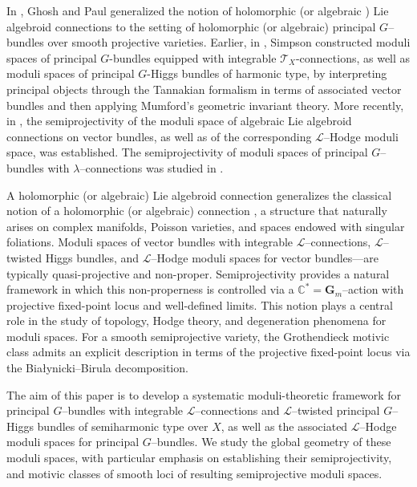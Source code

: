 \documentclass[12pt,reqno]{amsart}
\numberwithin{equation}{subsection}
\theoremstyle{definition}
\theoremstyle{theorem}
\begin{document}
 
In \cite{Ghosh-Paul-2025}, Ghosh and Paul generalized the notion of holomorphic (or algebraic ) Lie algebroid connections to the setting of holomorphic (or algebraic) principal $G$--bundles over smooth projective varieties. Earlier, in \cite{CT.Simpson-1995}, Simpson constructed moduli spaces of principal \(G\)-bundles equipped with integrable \(\mathcal{T}_{X}\)-connections, as well as moduli spaces of principal \(G\)-Higgs bundles of harmonic type, by interpreting principal objects through the Tannakian formalism in terms of associated vector bundles and then applying Mumford's geometric invariant theory. More recently, in \cite{Alfaya-Oliveire-2024}, the semiprojectivity of the moduli space of algebraic Lie algebroid connections on vector bundles, as well as of the corresponding $\mathcal{L}$--Hodge moduli space, was established. 
The semiprojectivity of moduli spaces of principal $G$--bundles with $\lambda$--connections was studied in \cite{Roy-Singh-2024}.

A holomorphic (or algebraic) Lie algebroid connection generalizes the classical notion of a holomorphic (or algebraic) connection \cite{Atiyah-1957}, a structure that naturally arises on complex manifolds, Poisson varieties, and spaces endowed with singular foliations. 
Moduli spaces of vector bundles with integrable $\mathcal{L}$--connections, $\mathcal{L}$--twisted Higgs bundles, and $\mathcal{L}$--Hodge moduli spaces for vector bundles—are typically quasi-projective and non-proper. 
Semiprojectivity \cite{T.Hausel-F. Villegas} provides a natural framework in which this non-properness is controlled via a $\mathbb{C}^{\ast}=\mathbf{G}_{m}$--action with projective fixed-point locus and well-defined limits. 
This notion plays a central role in the study of topology, Hodge theory, and degeneration phenomena for moduli spaces. 
For a smooth semiprojective variety, the Grothendieck motivic class admits an explicit description in terms of the projective fixed-point locus via the Bia{\l}ynicki--Birula decomposition.


The aim of this paper is to develop a systematic moduli-theoretic framework for principal $G$--bundles with integrable $\mathcal{L}$--connections and $\mathcal{L}$--twisted principal $G$--Higgs bundles of semiharmonic type over $X$, as well as the associated $\mathcal{L}$--Hodge moduli spaces for principal $G$--bundles. We study the global geometry of these moduli spaces, with particular emphasis on establishing their semiprojectivity, and motivic classes of smooth loci of resulting semiprojective moduli spaces.
\end{document}
